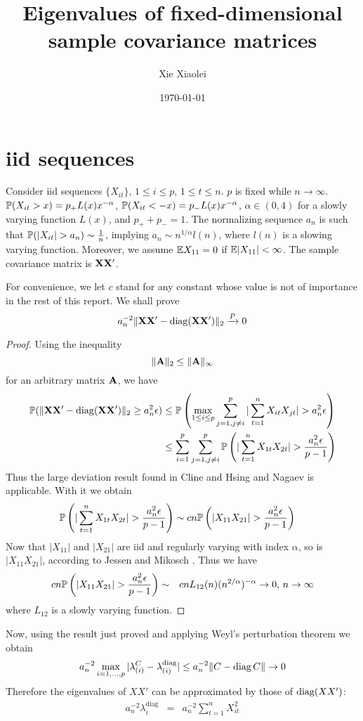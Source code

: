 \documentclass{article}
\title{Eigenvalues of fixed-dimensional sample covariance matrices}
\author{Xie Xiaolei}
\date{\today}
\newif\ifALL
\begin{document}
\maketitle

\ifALL
\section{iid sequences}\label{sec:iid}
Consider iid sequences $\{X_{it}\}$, $1 \leq i \leq p$, $1 \leq t \leq
n$. $p$ is fixed while $n \to \infty$. $\P(X_{it} > x) = p_+ L(x)
x^{-\alpha}$, $\P(X_{it} < -x) = p_- L(x) x^{-\alpha}$, $\alpha \in
(0,4)$ for a slowly varying function $L(x)$, and $p_+ + p_- = 1$. The
normalizing sequence $a_n$ is such that $\P(|X_{it}| > a_n) \sim {1
  \over n}$, implying $a_n \sim n^{1/\alpha} l(n)$, where $l(n)$ is a
slowing varying function. Moreover, we assume $\E X_{11} = 0$ if $\E
|X_{11}| < \infty$. The sample covariance matrix is $\mtx
{XX'}$.

For convenience, we let $c$ stand for any constant whose value is not
of importance in the rest of this report. We shall prove
\[
a_n^{-2}\|\mtx {XX'} - \diag(\mtx {XX'})\|_2 \xrightarrow{P} 0
\]

\begin{proof}
  Using the inequality
  \[
  \|\mtx A\|_2 \leq \|\mtx A\|_\infty
  \]
  for an arbitrary matrix $\mtx A$, we have
  \begin{align*}
    \P(\|\mtx {XX'} - \diag(\mtx {XX'})\|_2 \geq a_n^2 \epsilon) & \leq
    \P\left(\max_{1\leq i \leq p} \sum_{j=1, j\neq i}^p |\sum_{t=1}^n
    X_{it} X_{jt}| > a_n^2 \epsilon\right) \\
    &\leq \sum_{i=1}^p \sum_{j=1, j\neq i}^p \P\left(|\sum_{t=1}^n
    X_{1t} X_{2t}| > {a_n^2 \epsilon \over p-1}\right) \\
  \end{align*}
  Thus the large deviation result found in Cline and Hsing
  \cite{cline:hsing:1998} and Nagaev \cite{nagaev:1979} is
  applicable. With it we obtain
  \begin{align*}
    \P\left(|\sum_{t=1}^n X_{1t} X_{2t}| > {a_n^2 \epsilon \over p-1}\right)
    &\sim
    c n \P\left(|X_{11} X_{21}| > {a_n^2 \epsilon \over p-1 }\right)
  \end{align*}
  Now that $|X_{11}|$ and $|X_{21}|$ are iid and regularly varying
  with index $\alpha$, so is $|X_{11} X_{21}|$, according to Jessen
  and Mikosch \cite{jessen:mikosch:2006}. Thus we have
  \begin{eqnarray*}
    c n \P\left(|X_{11} X_{21}| > {a_n^2 \epsilon \over p-1 }\right)
    &\sim& c n L_{12}(n) (n^{2/\alpha})^{-\alpha} \to 0\text{,  }n\to\infty
  \end{eqnarray*}
  where $L_{12}$ is a slowly varying function.
\end{proof}
Now, using the result just proved and applying Weyl's perturbation
theorem we obtain
\[
a_n^{-2} \max_{i=1,\dots,p} |\lambda^C_{(i)} -
\lambda^{\text{diag}}_{(i)}| \leq  a_n^{-2}\|C - \diag{C}\| \to 0
\]
Therefore the eigenvalues of $XX'$ can be approximated by those of
$\diag(XX')$:
\begin{eqnarray*}
a_n^{-2}\lambda^{\text{diag}}_{i}  &=& a_n^{-2} \sum_{t=1}^n X_{it}^2
\end{eqnarray*}
\end{document}
